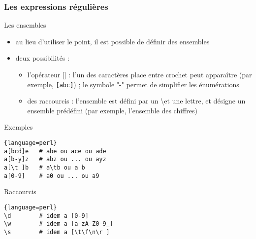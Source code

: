 \begin{frame}[fragile]
  \frametitle{Les expressions régulières}

  \begin{block}{Les ensembles}
    \begin{itemize}
    \item au lieu d'utiliser le point, il est possible de définir des
      ensembles
    \item deux possibilités :
      \begin{itemize}
      \item l'opérateur [] : l'un des caractères place entre crochet peut
        apparaître (par exemple, \texttt{[abc]}) ; le symbole "-" permet
        de simplifier les énumérations
      \item des raccourcis : l'ensemble est défini par un \textbackslash et une
        lettre, et désigne un ensemble prédéfini (par exemple, l'ensemble des
        chiffres)
      \end{itemize}
    \end{itemize}
  \end{block}

  \begin{exampleblock}{Exemples}
    \begin{lstlisting}{language=perl}
a[bcd]e	  # abe ou ace ou ade
a[b-y]z	  # abz ou ... ou ayz
a[\t ]b	  # a\tb ou a b
a[0-9]    # a0 ou ... ou a9
    \end{lstlisting}
  \end{exampleblock}

  \begin{alertblock}{Raccourcis}
    \begin{lstlisting}{language=perl}
\d        # idem a [0-9]
\w        # idem a [a-zA-Z0-9_]
\s        # idem a [\t\f\n\r ]
    \end{lstlisting}
  \end{alertblock}

\end{frame}

